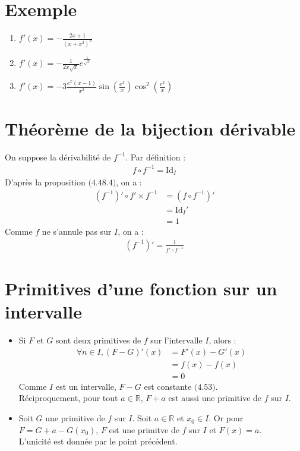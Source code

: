 \documentclass[../main.tex]{subfiles}
\begin{document}
\setcounter{section}{50}
\section{Exemple}
\begin{enumerate}
    \item $f'(x) = -\frac{2x + 1}{(x + x^2)^2}$
    \item $f'(x) = -\frac{1}{2x \sqrt{x}} e^\frac{1}{\sqrt{x}}$
    \item $f'(x) = -3 \frac{e^x(x-1)}{x^2} \sin \left( \frac{e^x}{x} \right) \cos^2 \left( \frac{e^x}{x} \right)$
\end{enumerate}

\section{Théorème de la bijection dérivable}
On suppose la dérivabilité de $f^{-1}$. Par définition : 
\begin{align*}
    f \circ f^{-1} = \text{Id}_I
\end{align*}
D'après la proposition $\text{(4.48.4)}$, on a :
\begin{align*}
    (f^{-1})' \circ f' \times f^{-1} &= (f \circ f^{-1})' \\ 
    &= \text{Id}_I' \\
    &= 1
\end{align*}
Comme $f$ ne s'annule pas sur $I$, on a : 
\begin{align*}
    (f^{-1})' = \frac{1}{f' \circ f^{-1}}
\end{align*}

\setcounter{section}{60}
\section{Primitives d'une fonction sur un intervalle}
\begin{itemize}
    \item Si $F$ et $G$ sont deux primitives de $f$ sur l'intervalle $I$, alors : 
    \begin{align*}
        \forall n \in I, (F - G)'(x) &= F'(x) - G'(x) \\
        &= f(x) - f(x) \\
        &= 0
    \end{align*}
    Comme $I$ est un intervalle, $F - G$ est constante $\text{(4.53)}$. \\
    Réciproquement, pour tout $a \in \mathbb{R}$, $F + a$ est aussi une primitive de $f$ sur $I$. \\

    \item Soit $G$ une primitive de $f$ sur $I$. Soit $a \in \mathbb{R}$ et $x_0 \in I$. 
    Or pour $F = G + a - G(x_0)$, $F$ est une primitve de $f$ sur $I$ et $F(x) = a$. \\
    L'unicité est donnée par le point précédent. 
\end{itemize}
\end{document}
